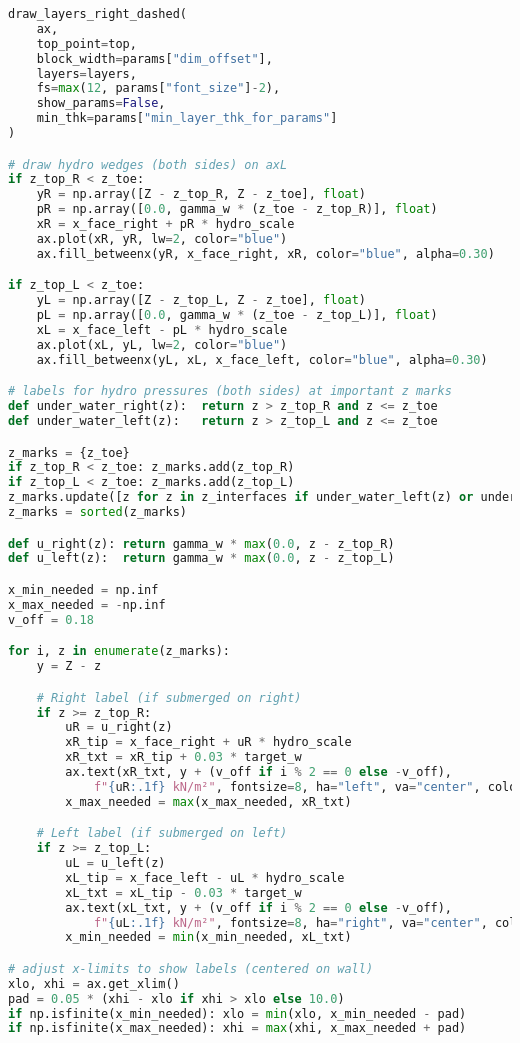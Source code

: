 \begin{lstlisting}[language=Python]
draw_layers_right_dashed(
    ax,
    top_point=top,
    block_width=params["dim_offset"],
    layers=layers,
    fs=max(12, params["font_size"]-2),
    show_params=False,
    min_thk=params["min_layer_thk_for_params"]
)

# draw hydro wedges (both sides) on axL
if z_top_R < z_toe:
    yR = np.array([Z - z_top_R, Z - z_toe], float)
    pR = np.array([0.0, gamma_w * (z_toe - z_top_R)], float)
    xR = x_face_right + pR * hydro_scale
    ax.plot(xR, yR, lw=2, color="blue")
    ax.fill_betweenx(yR, x_face_right, xR, color="blue", alpha=0.30)

if z_top_L < z_toe:
    yL = np.array([Z - z_top_L, Z - z_toe], float)
    pL = np.array([0.0, gamma_w * (z_toe - z_top_L)], float)
    xL = x_face_left - pL * hydro_scale
    ax.plot(xL, yL, lw=2, color="blue")
    ax.fill_betweenx(yL, xL, x_face_left, color="blue", alpha=0.30)

# labels for hydro pressures (both sides) at important z marks
def under_water_right(z):  return z > z_top_R and z <= z_toe
def under_water_left(z):   return z > z_top_L and z <= z_toe

z_marks = {z_toe}
if z_top_R < z_toe: z_marks.add(z_top_R)
if z_top_L < z_toe: z_marks.add(z_top_L)
z_marks.update([z for z in z_interfaces if under_water_left(z) or under_water_right(z)])
z_marks = sorted(z_marks)

def u_right(z): return gamma_w * max(0.0, z - z_top_R)
def u_left(z):  return gamma_w * max(0.0, z - z_top_L)

x_min_needed = np.inf
x_max_needed = -np.inf
v_off = 0.18

for i, z in enumerate(z_marks):
    y = Z - z

    # Right label (if submerged on right)
    if z >= z_top_R:
        uR = u_right(z)
        xR_tip = x_face_right + uR * hydro_scale
        xR_txt = xR_tip + 0.03 * target_w
        ax.text(xR_txt, y + (v_off if i % 2 == 0 else -v_off),
            f"{uR:.1f} kN/m²", fontsize=8, ha="left", va="center", color="blue")
        x_max_needed = max(x_max_needed, xR_txt)

    # Left label (if submerged on left)
    if z >= z_top_L:
        uL = u_left(z)
        xL_tip = x_face_left - uL * hydro_scale
        xL_txt = xL_tip - 0.03 * target_w
        ax.text(xL_txt, y + (v_off if i % 2 == 0 else -v_off),
            f"{uL:.1f} kN/m²", fontsize=8, ha="right", va="center", color="blue")
        x_min_needed = min(x_min_needed, xL_txt)

# adjust x-limits to show labels (centered on wall)
xlo, xhi = ax.get_xlim()
pad = 0.05 * (xhi - xlo if xhi > xlo else 10.0)
if np.isfinite(x_min_needed): xlo = min(xlo, x_min_needed - pad)
if np.isfinite(x_max_needed): xhi = max(xhi, x_max_needed + pad)


\end{lstlisting}
